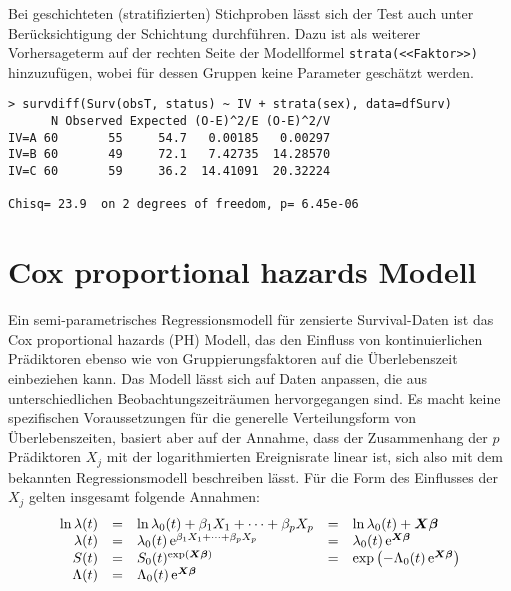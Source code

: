 Bei geschichteten (stratifizierten) Stichproben lässt sich der Test auch unter Berücksichtigung der Schichtung durchführen. Dazu ist als weiterer Vorhersageterm auf der rechten Seite der Modellformel \lstinline!strata(<<Faktor>>)! hinzuzufügen, wobei für dessen Gruppen keine Parameter geschätzt werden.
\begin{lstlisting}
> survdiff(Surv(obsT, status) ~ IV + strata(sex), data=dfSurv)
      N Observed Expected (O-E)^2/E (O-E)^2/V
IV=A 60       55     54.7   0.00185   0.00297
IV=B 60       49     72.1   7.42735  14.28570
IV=C 60       59     36.2  14.41091  20.32224

Chisq= 23.9  on 2 degrees of freedom, p= 6.45e-06
\end{lstlisting}

\section{Cox proportional hazards Modell}
\label{sec:survCPH}

Ein semi-parametrisches Regressionsmodell für zensierte Survival-Daten ist das Cox proportional hazards (PH) Modell, das den Einfluss von kontinuierlichen Prädiktoren ebenso wie von Gruppierungsfaktoren auf die Überlebenszeit einbeziehen kann. Das Modell lässt sich auf Daten anpassen, die aus unterschiedlichen Beobachtungszeiträumen hervorgegangen sind. Es macht keine spezifischen Voraussetzungen für die generelle Verteilungsform von Überlebenszeiten, basiert aber auf der Annahme, dass der Zusammenhang der $p$ Prädiktoren $X_{j}$ mit der logarithmierten Ereignisrate linear ist, sich also mit dem bekannten Regressionsmodell beschreiben lässt. Für die Form des Einflusses der $X_{j}$ gelten insgesamt folgende Annahmen:
\begin{equation*}
\begin{array}{rclcl}
\ln \lambda(t) &=& \ln \lambda_{0}(t) + \beta_{1} X_{1} + \dots + \beta_{p} X_{p}           &=& \ln \lambda_{0}(t) + \bm{X} \bm{\beta}\\
    \lambda(t) &=&     \lambda_{0}(t) \, {\mathrm{e}}^{\beta_{1} X_{1} + \dots + \beta_{p} X_{p}} &=& \lambda_{0}(t) \, {\mathrm{e}}^{\bm{X} \bm{\beta}}\\
S(t)           &=& S_{0}(t)^{\exp(\bm{X} \bm{\beta})} &=& \exp\left(-\Lambda_{0}(t) \, {\mathrm{e}}^{\bm{X} \bm{\beta}}\right)\\
\Lambda(t)     &=& \Lambda_{0}(t) \, {\mathrm{e}}^{\bm{X} \bm{\beta}} & &
\end{array}
\end{equation*}

